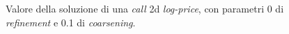 \documentclass[a4paper,10pt]{report}
\theoremstyle{plain}
\theoremstyle{definition}
\theoremstyle{remark}
\begin{document}
\begin{figure}[htp!]
\begin{center}
\caption{Valore della soluzione di una \emph{call} 2d \emph{log-price}, con parametri 0 di \emph{refinement} e 0.1 di \emph{coarsening}.}
\label{fig:test5-2}
\end{center}
\end{figure}
\end{document}
